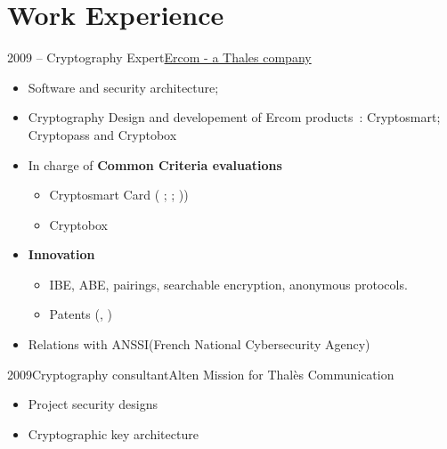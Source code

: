 \documentclass[a4paper]{customcv}
\begin{document}
\makeprofile
\section{Work Experience}

\begin{cventry}{2009 -- }{Cryptography Expert}{\href{https://www.ercom.fr/}{Ercom - a Thales company}}
  \begin{itemize}
    \item Software and security architecture;
    \item Cryptography Design and developement of Ercom products~:\linebreak
          Cryptosmart; Cryptopass and Cryptobox
    \item In charge of \textbf{Common Criteria evaluations}
          \begin{itemize}
            \item Cryptosmart Card (\cite{anssi.2012/71} ; \cite{anssi.2016/69}; \cite{anssi.2019/38}))
            \item Cryptobox \cite{anssi.2018/23}
          \end{itemize}
    \item \textbf{Innovation}
          \begin{itemize}
            \item IBE, ABE, pairings, searchable encryption, anonymous protocols.
            \item Patents (\cite{pat.save}, \cite{pat.card.auth})
          \end{itemize}
    \item Relations with ANSSI(French National Cybersecurity Agency)
  \end{itemize}
\end{cventry}

\begin{cventry}{2009}{Cryptography consultant}{Alten}
  Mission for Thalès Communication
  \begin{itemize}
    \item Project security designs
    \item Cryptographic key architecture
  \end{itemize}
\end{cventry}
\end{document}
